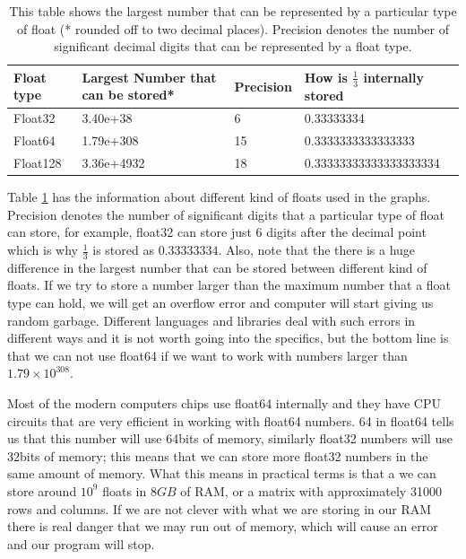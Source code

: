 \begin{table}[hbt!]
    \centering
    \begin{tabular}{||m{2cm} | m{3.2cm} | m{1.5cm} | m{4.5cm}||}
        \hline
        Float type & Largest Number that can be stored* & Precision & How is $\frac{1}{3}$ internally stored \\ [0.5ex]
        \hline\hline

        Float32    & 3.40e+38                           & 6         & 0.33333334                             \\

        Float64    & 1.79e+308                          & 15        & 0.3333333333333333                     \\

        Float128   & 3.36e+4932                         & 18        & 0.33333333333333333334                 \\ [1ex]
        \hline
    \end{tabular}
    \caption{This table shows the largest number that can be represented by a particular type of float (* rounded off to two decimal places). Precision denotes the number of significant decimal digits that can be represented by a float type.}
    \label{table:floats}
\end{table}

Table \ref{table:floats} has the information about different kind of floats used in the graphs. Precision denotes the number of significant digits that a particular type of float can store, for example, float32 can store just 6 digits after the decimal point which is why $\frac{1}{3}$ is stored as $0.33333334$. Also, note that the there is a huge difference in the largest number that can be stored between different kind of floats.
If we try to store a number larger than the maximum number that a float type can hold, we will get an overflow error and computer will start giving us random garbage. Different languages and libraries deal with such errors in different ways and it is not worth going into the specifics, but the bottom line is that we can not use float64 if we want to work with numbers larger than $1.79\times 10^{308}$.


Most of the modern computers chips use float64 internally and they have CPU circuits that are very efficient in working with float64 numbers. 64 in float64 tells us that this number will use 64bits of memory, similarly float32 numbers will use 32bits of memory; this means that we can store more float32 numbers in the same amount of memory. What this means in practical terms is that a we can store around $10^9$ floats in $8GB$ of RAM, or a matrix with approximately 31000 rows and columns. If we are not clever with what we are storing in our RAM there is real danger that we may run out of memory, which will cause an error and our program will stop.


